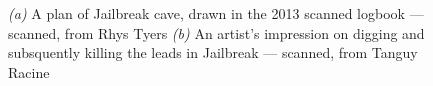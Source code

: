 	\begin{figure}[t!]
		\checkoddpage \ifoddpage \forcerectofloat \else \forceversofloat \fi
		\centering

		\begin{subfigure}{\textwidth}
			\centering
			\caption{}\label{}
		\end{subfigure}

		\begin{subfigure}{\textwidth}
			\centering
			\caption{}\label{}
		\end{subfigure}
	\caption{
		\emph{(a)} A plan of Jailbreak cave, drawn in the 2013 scanned logbook --- scanned, from Rhys Tyers 
		\emph{(b)} An artist's impression on digging and subsquently killing the leads in Jailbreak --- scanned, from Tanguy Racine
		}
	
	\end{figure}


